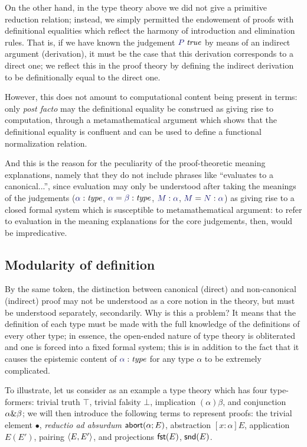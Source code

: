 \documentclass[main.tex]{subfiles}
\begin{document}
On the other hand, in the type theory above we did not give a
primitive reduction relation; instead, we simply permitted the
endowement of proofs with definitional equalities which reflect the
harmony of introduction and elimination rules. That is, if we have
known the judgement $\istrue{P}$ by means of an indirect argument
(derivation), it must be the case that this derivation corresponds to
a direct one; we reflect this in the proof theory by defining the
indirect derivation to be definitionally equal to the direct one.

However, this does not amount to computational content being present in terms:
only \emph{post facto} may the definitional equality be construed as giving
rise to computation, through a metamathematical argument which shows that the
definitional equality is confluent and can be used to define a functional
normalization relation.

And this is the reason for the peculiarity of the proof-theoretic
meaning explanations, namely that they do not include phrases like
``evaluates to a canonical...'', since evaluation may only be
understood after taking the meanings of the judgements ($\type\alpha$,
$\etype{\alpha}{\beta}$, $\ofty{M}{\alpha}$, $\eofty{M}{N}{\alpha}$) as giving rise to a
closed formal system which is susceptible to metamathematical
argument: to refer to evaluation in the meaning explanations for the
core judgements, then, would be impredicative.

\subsection{Modularity of definition}

By the same token, the distinction between canonical (direct) and non-canonical
(indirect) proof may not be understood as a core notion in the theory, but must
be understood separately, secondarily. Why is this a problem? It means that the
definition of each type must be made with the full knowledge of the definitions
of every other type; in essence, the open-ended nature of type theory is
obliterated and one is forced into a fixed formal system; this is in addition
to the fact that it causes the epistemic content of $\type\alpha$ for any type
$\alpha$ to be extremely complicated.

To illustrate, let us consider as an example a type theory which has
four type-formers: trivial truth $\top$, trivial falsity $\bot$,
implication $(\alpha)\beta$, and conjunction $\alpha\&\beta$; we
will then introduce the following terms to represent proofs: the
trivial element $\bullet$, \emph{reductio ad absurdum}
$\mathsf{abort}(\alpha;E)$, abstraction $[x:\alpha]E$, application $E(E')$,
pairing $\langle E,E'\rangle$, and projections $\mathsf{fst}(E)$, $\mathsf{snd}(E)$.
\end{document}
